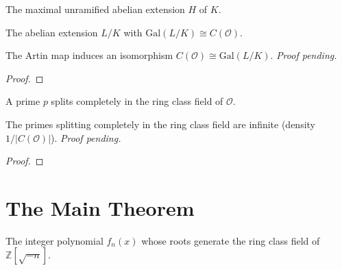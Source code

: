 \begin{definition}
  \label{def:hilbert_class_field}
  \leanok
  The maximal unramified abelian extension $H$ of $K$.
\end{definition}

\begin{definition}
  \label{def:ring_class_field}
  \leanok
  The abelian extension $L/K$ with $\mathrm{Gal}(L/K) \cong C(\mathcal O)$.
\end{definition}

\begin{theorem}
  \label{thm:artin_reciprocity}
  \leanok
  The Artin map induces an isomorphism $C(\mathcal O) \cong \mathrm{Gal}(L/K)$.
  \emph{Proof pending.}
\end{theorem}
\begin{proof}
\end{proof}

\begin{definition}
  \label{def:splits_completely}
  \leanok
  A prime $p$ splits completely in the ring class field of $\mathcal O$.
\end{definition}

\begin{theorem}
  \label{thm:chebotarev}
  \leanok
  The primes splitting completely in the ring class field are infinite (density
  $1/|C(\mathcal O)|$). \emph{Proof pending.}
\end{theorem}
\begin{proof}
\end{proof}

\section{The Main Theorem}

\begin{definition}
  \label{def:class_polynomial}
  \leanok
  The integer polynomial $f_n(x)$ whose roots generate the ring class field of
  $\mathbb Z[\sqrt{-n}]$.
\end{definition}

